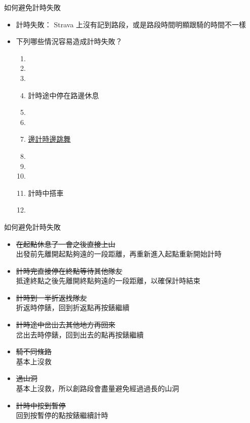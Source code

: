 \begin{frame}[fragile]{如何避免計時失敗}
\begin{itemize}
\item 計時失敗： Strava 上沒有記到路段，或是路段時間明顯跟騎的時間不一樣
\item 下列哪些情況容易造成計時失敗？
\begin{enumerate}[A]
\item {}
\item {}
\item {}
\item 計時途中停在路邊休息
\item {}
\item {}
\item \href{https://www.instagram.com/reel/C5tCGSeyQNI/?utm_source=ig_web_button_share_sheet}{邊計時邊跳舞}
\item {}
\item {}
\item {}
\item 計時中搭車
\item {}
\end{enumerate}
\end{itemize}
\end{frame}

\begin{frame}{如何避免計時失敗}
\begin{itemize}
\item \sout{在起點休息了一會之後直接上山}\\
出發前先離開起點夠遠的一段距離，再重新進入起點重新開始計時\pause
\item \sout{計時完直接停在終點等待其他隊友}\\
抵達終點之後先離開終點夠遠的一段距離，以確保計時結束\pause
\item \sout{計時到一半折返找隊友}\\
折返時停錶，回到折返點再按錶繼續\pause
\item \sout{計時途中岔出去其他地方再回來}\\
岔出去時停錶，回到出去的點再按錶繼續\pause
\item \sout{騎不同條路}\\
基本上沒救\pause
\item \sout{過山洞}\\
基本上沒救，所以創路段會盡量避免經過過長的山洞\pause
\item \sout{計時中按到暫停}\\
回到按暫停的點按錶繼續計時
\end{itemize}
\end{frame}

